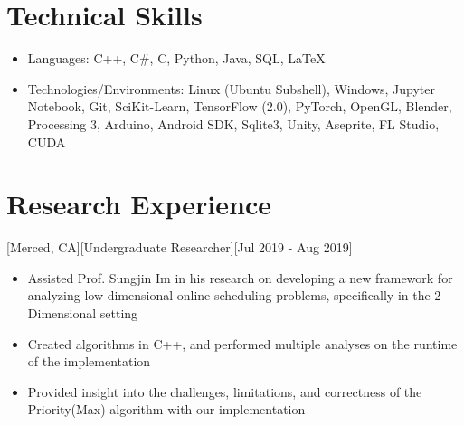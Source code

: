 \documentclass{article}
\begin{document}
\section{Technical Skills}
\begin{itemize}
  \item Languages: C++, C\#, C, Python, Java, SQL, \LaTeX
  \item Technologies/Environments: Linux (Ubuntu Subshell), Windows, Jupyter Notebook, Git, SciKit-Learn, TensorFlow (2.0), PyTorch, OpenGL, Blender, Processing 3, Arduino, Android SDK, Sqlite3, Unity, Aseprite, FL Studio, CUDA
\end{itemize}

\section{Research Experience}
[Merced, CA][Undergraduate Researcher][Jul 2019 - Aug 2019]
\begin{itemize}
  \item Assisted Prof. Sungjin Im in his research on developing a new framework for analyzing low dimensional online scheduling problems, specifically in the 2-Dimensional setting
  \item Created algorithms in C++, and performed multiple analyses on the runtime of the implementation
  \item Provided insight into the challenges, limitations, and correctness of the Priority(Max) algorithm with our implementation
\end{itemize}
\end{document}
